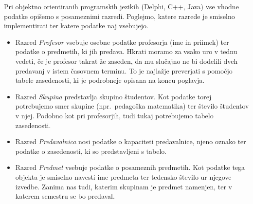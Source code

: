 \documentclass[a4paper,10pt]{article}
\begin{document}
Pri objektno orientiranih programskih jezikih (Delphi, C++, Java) vse vhodne podatke
opišemo s posameznimi razredi. Poglejmo, katere razrede je smiselno implementirati ter
katere podatke naj vsebujejo.



\begin{itemize}
   \item Razred \emph{Profesor} vsebuje osebne podatke profesorja (ime in priimek) ter
      podatke o predmetih, ki jih predava. Hkrati moramo za vsako uro v tednu vedeti, če
      je profesor takrat že zaseden, da mu slučajno ne bi dodelili dveh predavanj v istem
      časovnem terminu. To je najlažje preverjati s pomočjo tabele zasedenosti, ki je
      podrobneje opisana na koncu poglavja.
   
   \item Razred \emph{Skupina} predstavlja skupino študentov. Kot podatke torej potrebujemo
      smer skupine (npr.~pedagoška matematika) ter število študentov v njej. Podobno kot pri
      profesorjih, tudi tukaj potrebujemo tabelo zasedenosti.
   
   \item Razred \emph{Predavalnica} nosi podatke o kapaciteti predavalnice, njeno oznako
      ter podatke o zasedenosti, ki so predstavljeni s tabelo.
   
   \item Razred \emph{Predmet} vsebuje podatke o posameznih predmetih. Kot podatke tega
      objekta je smiselno navesti ime predmeta ter tedensko število ur njegove izvedbe.
      Zanima nas tudi, katerim skupinam je predmet namenjen, ter v katerem semestru se bo
      predaval.
\end{itemize}
\end{document}
